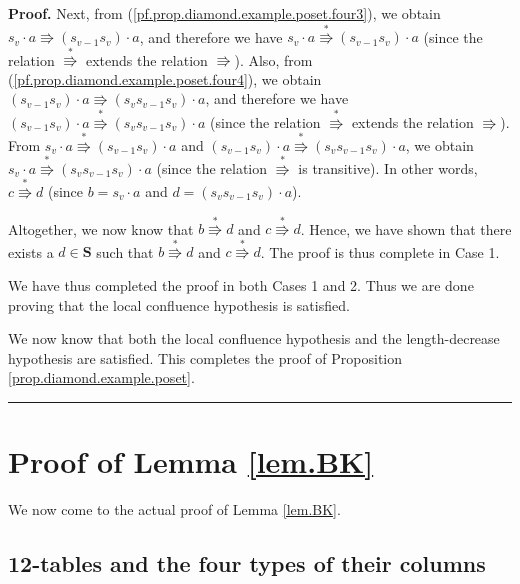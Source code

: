 \documentclass[numbers=enddot,12pt,final,onecolumn,notitlepage]{scrartcl}%
\theoremstyle{definition}
\newenvironment{proof}[1][Proof]{\noindent\textbf{#1.} }{\ \rule{0.5em}{0.5em}}
\newenvironment{verlong}{}{}
\begin{document}
\begin{proof}
\begin{verlong}
Next, from (\ref{pf.prop.diamond.example.poset.four3}), we obtain $s_{v}\cdot
a\Rrightarrow\left(  s_{v-1}s_{v}\right)  \cdot a$, and therefore we have
$s_{v}\cdot a\overset{\ast}{\Rrightarrow}\left(  s_{v-1}s_{v}\right)  \cdot a$
(since the relation $\overset{\ast}{\Rrightarrow}$ extends the relation
$\Rrightarrow$). Also, from (\ref{pf.prop.diamond.example.poset.four4}), we
obtain $\left(  s_{v-1}s_{v}\right)  \cdot a\Rrightarrow\left(  s_{v}%
s_{v-1}s_{v}\right)  \cdot a$, and therefore we have $\left(  s_{v-1}%
s_{v}\right)  \cdot a\overset{\ast}{\Rrightarrow}\left(  s_{v}s_{v-1}%
s_{v}\right)  \cdot a$ (since the relation $\overset{\ast}{\Rrightarrow}$
extends the relation $\Rrightarrow$). From $s_{v}\cdot a\overset{\ast
}{\Rrightarrow}\left(  s_{v-1}s_{v}\right)  \cdot a$ and $\left(  s_{v-1}%
s_{v}\right)  \cdot a\overset{\ast}{\Rrightarrow}\left(  s_{v}s_{v-1}%
s_{v}\right)  \cdot a$, we obtain $s_{v}\cdot a\overset{\ast}{\Rrightarrow
}\left(  s_{v}s_{v-1}s_{v}\right)  \cdot a$ (since the relation $\overset{\ast
}{\Rrightarrow}$ is transitive). In other words, $c\overset{\ast
}{\Rrightarrow}d$ (since $b=s_{v}\cdot a$ and $d=\left(  s_{v}s_{v-1}%
s_{v}\right)  \cdot a$).

Altogether, we now know that $b\overset{\ast}{\Rrightarrow}d$ and
$c\overset{\ast}{\Rrightarrow}d$. Hence, we have shown that there exists a
$d\in\mathbf{S}$ such that $b\overset{\ast}{\Rrightarrow}d$ and
$c\overset{\ast}{\Rrightarrow}d$. The proof is thus complete in Case 1.

We have thus completed the proof in both Cases 1 and 2. Thus we are done
proving that the local confluence hypothesis is satisfied.
\end{verlong}

We now know that both the local confluence hypothesis and the length-decrease
hypothesis are satisfied. This completes the proof of Proposition
\ref{prop.diamond.example.poset}.
\end{proof}

\section{\label{sect.proof}Proof of Lemma \ref{lem.BK}}

We now come to the actual proof of Lemma \ref{lem.BK}.

\subsection{\label{subsect.fourtypes}12-tables and the four types of their
columns}
\end{document}

